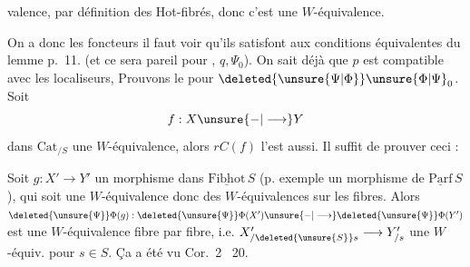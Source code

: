 %
valence, par définition des Hot-fibrés, donc c'est une $W$-équivalence.

On a donc les foncteurs
il faut voir qu'ils satisfont aux conditions équivalentes du lemme p.~11. (et ce sera pareil pour , $q,\Psi_0$). On sait déjà que $p$ est compatible avec les localiseurs, 
 Prouvons le pour $\deleted{\unsure{\Psi|\Phi}}\unsure{\Phi|\Psi}_0$. Soit
\[
 f:X\unsure{\mathord{-}|\longrightarrow}Y
\]
dans $\mathrm{Cat}_{/S}$ une $W$-équivalence, alors $rC(f)$ l'est aussi. Il suffit de prouver ceci :

Soit \quad $g:X'\longrightarrow Y'$
un morphisme dans $\underline{\mathrm{Fibhot}}\,S$ (p. exemple un morphisme de $\underline{\mathrm{Parf}}\,S$), qui soit une $W$-équivalence donc des $W$-équivalences sur les fibres. Alors $\deleted{\unsure{\Psi}}\Phi(g):\deleted{\unsure{\Psi}}\Phi(X')\unsure{\mathord{-}|\longrightarrow}\deleted{\unsure{\Psi}}\Phi(Y')$ est une $W$-équivalence fibre par fibre,
i.e. \quad $X'_{/\deleted{\unsure{S}}s}\longrightarrow Y'_{/s}$ une $W$-équiv. pour  $s\in S$. Ça a été vu  Cor.~2 ~20.
